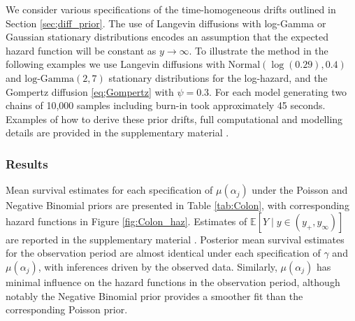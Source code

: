 \documentclass[ba,preprint]{imsart}
\theoremstyle{plain}
\theoremstyle{definition}
\theoremstyle{remark}
\begin{document}
We consider various specifications of the time-homogeneous drifts outlined in Section \ref{sec;diff_prior}. The use of Langevin diffusions with log-Gamma or Gaussian stationary distributions encodes an assumption that the expected hazard function will be constant as $y\to\infty$. To illustrate the method in the following examples we use Langevin diffusions with $\text{Normal}(\log(0.29),0.4)$ and $\text{log-Gamma}(2,7)$ stationary distributions for the log-hazard, and the Gompertz diffusion \eqref{eq;Gompertz} with $\psi = 0.3$. For each model generating two chains of 10,000 samples including burn-in took approximately 45 seconds. Examples of how to derive these prior drifts, full computational and modelling details are provided in the supplementary material \citep[{\color{red}Section 3}]{Hardcastle2024supp}.

\subsubsection{Results} %

Mean survival estimates for each specification of $\mu(\alpha_j)$ under the Poisson and Negative Binomial priors are presented in Table \ref{tab:Colon}, with corresponding hazard functions in Figure \ref{fig:Colon_haz}. {\color{red}Estimates of $\mathbb{E}[Y\mid y \in(y_+,y_\infty)]$ are reported in the supplementary material \citep[Section 3.2]{Hardcastle2024supp}.} Posterior mean survival estimates for the observation period are almost identical under each specification of $\gamma$ and $\mu(\alpha_j)$, with inferences driven by the observed data. Similarly, $\mu(\alpha_j)$ has minimal influence on the hazard functions in the observation period, although notably the Negative Binomial prior provides a smoother fit than the corresponding Poisson prior. 
\end{document}
